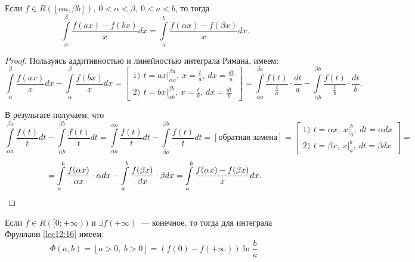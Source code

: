 \documentclass[../../main.tex]{subfiles}
\begin{document}
\begin{lem}[Фруллани]
Если $f \in R([\alpha a, \beta b]),\ 0 < \alpha < \beta,\ 0 < a < b$, то тогда 
\begin{equation}
\int\limits_\alpha^\beta \frac{f(ax) - f(bx)}x dx = \int\limits_a^b 
\frac{f(\alpha x) - f(\beta x)}x dx.
\label{lec12:17} 
\end{equation}
\end{lem}

\begin{proof}
Пользуясь аддитивностью и линейностью интеграла Римана, имеем: 
\[\int\limits_\alpha^\beta \frac{f(ax)}x dx - \int\limits_\alpha^\beta 
\frac{f(bx)}x dx = \left[
\begin{gathered}
1)\ \, t = ax\big|_{\alpha a}^{\beta a},\ x = \frac ta,\ dx = \frac{dt}a \\
2)\ \, t = bx\big|_{\alpha b}^{\beta b},\ x = \frac tb,\ dx = \frac{dt}b
\end{gathered}
\right] = \int\limits_{\alpha a}^{\beta a} \frac{f(t)}{\frac ta} \cdot \frac 
{dt}a - \int\limits_{\alpha b}^{\beta b} \frac{f(t)}{\frac tb} \cdot \frac 
{dt}b.\] 

В результате получаем, что
\[\int\limits_{\alpha a}^{\beta a} \dfrac{f(t)}t dt - \int\limits_{\alpha 
b}^{\beta b} \frac{f(t)}t dt = \int\limits_{\alpha a}^{\alpha b} \frac{f(t)}t 
dt - \int\limits_{\beta a}^{\beta b} \frac{f(t)}t dt = [\text{обратная 
замена}] = \left[
\begin{gathered}
1)\ \, t = \alpha x,\ x\big|_a^b,\ dt = \alpha dx \\
2)\ \, t = \beta x,\ x\big|_a^b,\ dt = \beta dx
\end{gathered}
\right] =\]
\[= \int\limits_a^b \frac{f(\alpha x)}{\alpha x} \cdot \alpha dx - 
\int\limits_a^b \frac{f(\beta x)}{\beta x} \cdot\beta dx = \int\limits_a^b 
\frac{f(\alpha x) - f(\beta x)}x dx. \qedhere\]
\end{proof}

\begin{thm}
Если $f \in R([0; +\infty))$ и $\exists f(+\infty)$~--- конечное, то тогда для 
интеграла Фруллани \eqref{lec12:16} имеем:
\begin{equation}
\Phi(a, b) = [a > 0,\ b > 0] = (f(0) - f(+\infty))\ln \frac ba. 
\label{lec12:18} 
\end{equation}
\end{thm}
\end{document}
